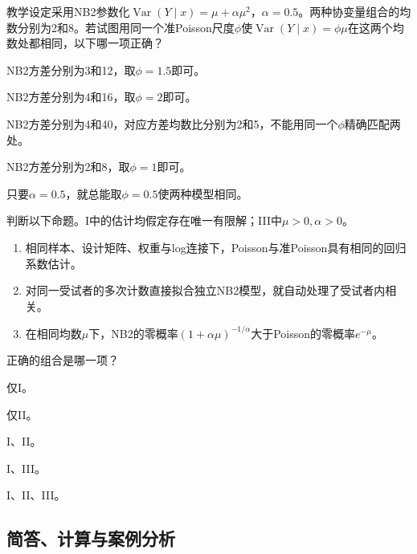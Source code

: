 \par\noindent\begin{minipage}{\linewidth}
教学设定采用NB2参数化$\operatorname{Var}(Y\mid x)=\mu+\alpha\mu^2$，$\alpha=0.5$。两种协变量组合的均数分别为2和8。若试图用同一个准Poisson尺度$\phi$使$\operatorname{Var}(Y\mid x)=\phi\mu$在这两个均数处都相同，以下哪一项正确？
\begin{choices}
\item NB2方差分别为3和12，取$\phi=1.5$即可。
\item NB2方差分别为4和16，取$\phi=2$即可。
\item NB2方差分别为4和40，对应方差均数比分别为2和5，不能用同一个$\phi$精确匹配两处。
\item NB2方差分别为2和8，取$\phi=1$即可。
\item 只要$\alpha=0.5$，就总能取$\phi=0.5$使两种模型相同。
\end{choices}
\end{minipage}\par\medskip

\par\noindent\begin{minipage}{\linewidth}
判断以下命题。I中的估计均假定存在唯一有限解；III中$\mu>0,\alpha>0$。\begin{enumerate}[label=\Roman*.]\item 相同样本、设计矩阵、权重与log连接下，Poisson与准Poisson具有相同的回归系数估计。\item 对同一受试者的多次计数直接拟合独立NB2模型，就自动处理了受试者内相关。\item 在相同均数$\mu$下，NB2的零概率$(1+\alpha\mu)^{-1/\alpha}$大于Poisson的零概率$e^{-\mu}$。\end{enumerate}正确的组合是哪一项？
\begin{choices}
\item 仅I。
\item 仅II。
\item I、II。
\item I、III。
\item I、II、III。
\end{choices}
\end{minipage}\par\medskip

\subsection{简答、计算与案例分析}

